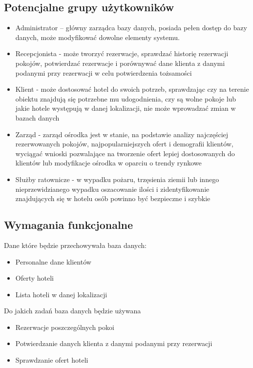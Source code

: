 \documentclass[12pt,a4paper]{article}
\begin{document}
\subsection{Potencjalne grupy użytkowników}
\label{sec:Users}

\begin{itemize}
	\item Administrator – główny zarządca bazy danych, posiada pełen dostęp do bazy danych, może modyfikować dowolne elementy systemu.
	\item Recepcjonista - może tworzyć rezerwacje, sprawdzać historię rezerwacji pokojów, potwierdzać rezerwacje i porównywać dane klienta z danymi podanymi przy rezerwacji w celu potwierdzenia tożsamości
	\item Klient - może dostosować hotel do swoich potrzeb, sprawdzając czy na terenie obiektu znajdują się potrzebne mu udogodnienia, czy są wolne pokoje lub jakie hotele występują w danej lokalizacji, nie może wprowadzać zmian w bazach danych
	\item Zarząd - zarząd ośrodka jest w stanie, na podstawie analizy najczęściej rezerwowanych pokojów, najpopularniejszych ofert i demografii klientów, wyciągać wnioski pozwalające na tworzenie ofert lepiej dostosowanych do klientów lub modyfikacje ośrodka w oparciu o trendy rynkowe
	\item Służby ratownicze - w wypadku pożaru, trzęsienia ziemii lub innego nieprzewidzianego wypadku oszacowanie ilości i zidentyfikowanie znajdujących się w hotelu osób powinno być bezpieczne i szybkie
	
\end{itemize}
\newpage
\subsection{Wymagania funkcjonalne}
\label{sec:FunctionalConditions}

Dane które będzie przechowywała baza danych:
\begin{itemize}
    \item Personalne dane klientów
    \item Oferty hoteli
    \item Lista hoteli w danej lokalizacji
\end{itemize}

Do jakich zadań baza danych będzie używana

\begin{itemize}
    \item Rezerwacje poszczególnych pokoi
    \item Potwierdzanie danych klienta z danymi podanymi przy rezerwacji
    \item Sprawdzanie ofert hoteli
\end{itemize}
\end{document}
